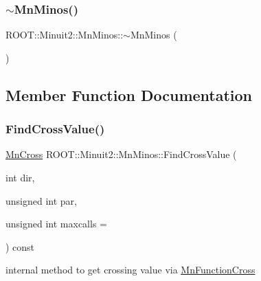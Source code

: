 \subsubsection{\texorpdfstring{$\sim$MnMinos()}{~MnMinos()}\hspace{0.1cm}{\footnotesize\ttfamily [3/3]}}
{\footnotesize\ttfamily R\+O\+O\+T\+::\+Minuit2\+::\+Mn\+Minos\+::$\sim$\+Mn\+Minos (\begin{DoxyParamCaption}{ }\end{DoxyParamCaption})\hspace{0.3cm}{\ttfamily [inline]}}



\subsection{Member Function Documentation}
\mbox{\label{classROOT_1_1Minuit2_1_1MnMinos_a4b8df109769bd0bee2127da68615bb11}} 
\subsubsection{\texorpdfstring{FindCrossValue()}{FindCrossValue()}\hspace{0.1cm}{\footnotesize\ttfamily [1/3]}}
{\footnotesize\ttfamily \mbox{\hyperlink{classROOT_1_1Minuit2_1_1MnCross}{Mn\+Cross}} R\+O\+O\+T\+::\+Minuit2\+::\+Mn\+Minos\+::\+Find\+Cross\+Value (\begin{DoxyParamCaption}\item[{int}]{dir,  }\item[{unsigned int}]{par,  }\item[{unsigned int}]{maxcalls = {} }\end{DoxyParamCaption}) const\hspace{0.3cm}{\ttfamily [protected]}}



internal method to get crossing value via \mbox{\hyperlink{classROOT_1_1Minuit2_1_1MnFunctionCross}{Mn\+Function\+Cross}} 

